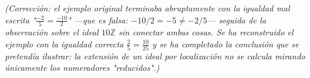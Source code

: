 \emph{(Corrección: el ejemplo original terminaba abruptamente con la igualdad mal escrita "$\frac{-2}{5}=\frac{-10}{2}$" —que es falsa: $-10/2=-5\neq -2/5$— seguida de la observación sobre el ideal $10\mathbb{Z}$ sin conectar ambas cosas. Se ha reconstruido el ejemplo con la igualdad correcta $\frac{2}{5}=\frac{10}{25}$ y se ha completado la conclusión que se pretendía ilustrar: la extensión de un ideal por localización no se calcula mirando únicamente los numeradores "reducidos".)}